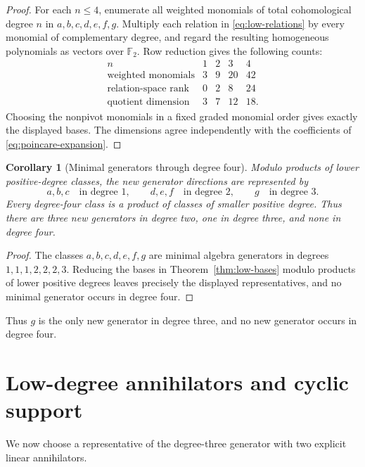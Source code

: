\documentclass[11pt]{amsart}
\newtheorem{corollary}[theorem]{Corollary}
\theoremstyle{definition}
\theoremstyle{remark}
\newcommand{\F}{\mathbb F}
\begin{document}
\begin{proof}
For each \(n\leq4\), enumerate all weighted monomials of total cohomological degree \(n\) in \(a,b,c,d,e,f,g\).  Multiply each relation in \eqref{eq:low-relations} by every monomial of complementary degree, and regard the resulting homogeneous polynomials as vectors over \(\F_2\).  Row reduction gives the following counts:
\[
\begin{array}{c|cccc}
n&1&2&3&4\\
\hline
\text{weighted monomials}&3&9&20&42\\
\text{relation-space rank}&0&2&8&24\\
\text{quotient dimension}&3&7&12&18.
\end{array}
\]
Choosing the nonpivot monomials in a fixed graded monomial order gives exactly the displayed bases.  The dimensions agree independently with the coefficients of \eqref{eq:poincare-expansion}.
\end{proof}

\begin{corollary}[Minimal generators through degree four]
\label{cor:minimal-generators}
Modulo products of lower positive-degree classes, the new generator directions are represented by
\[
a,b,c \quad\text{in degree }1,
\qquad
d,e,f \quad\text{in degree }2,
\qquad
g \quad\text{in degree }3.
\]
Every degree-four class is a product of classes of smaller positive degree.  Thus there are three new generators in degree two, one in degree three, and none in degree four.
\end{corollary}

\begin{proof}
The classes \(a,b,c,d,e,f,g\) are minimal algebra generators in degrees \(1,1,1,2,2,2,3\).  Reducing the bases in Theorem~\ref{thm:low-bases} modulo products of lower positive degrees leaves precisely the displayed representatives, and no minimal generator occurs in degree four.
\end{proof}

Thus $g$ is the only new generator in degree three, and no new generator occurs in degree four.


\section{Low-degree annihilators and cyclic support}
\label{sec:annihilators}

We now choose a representative of the degree-three generator with two explicit linear annihilators.
\end{document}
